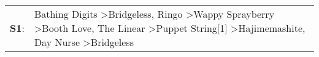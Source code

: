 \begin{supertabular}{p{0.03\textwidth}p{0.92\textwidth}}
 \textbf{S1}:  &  Bathing Digits\textsuperscript{} \textgreater \enspace Bridgeless\textsuperscript{}, \enspace Ringo\textsuperscript{} \textgreater \enspace Wappy Sprayberry\textsuperscript{} \textgreater \enspace Booth Love\textsuperscript{}, \enspace The Linear\textsuperscript{} \textgreater \enspace Puppet String[1]\textsuperscript{} \textgreater \enspace Hajimemashite\textsuperscript{}, \enspace Day Nurse\textsuperscript{} \textgreater \enspace Bridgeless\textsuperscript{}  \enspace  \\
\end{supertabular}
